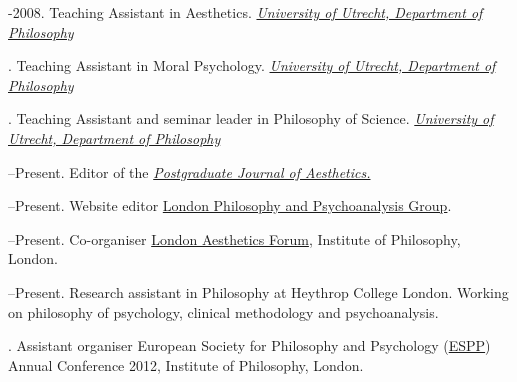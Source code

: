 \documentclass[11pt]{article}
\begin{document}
% 
% 
% 
-2008. Teaching Assistant in Aesthetics. \href{http://www.uu.nl/faculty/humanities/EN/organisation/departments/departmentofphilosophy/Pages/default.aspx}{\emph{University of Utrecht, Department of  Philosophy}} \vspace{0.01in}

. Teaching Assistant in Moral Psychology. \href{http://www.uu.nl/faculty/humanities/EN/organisation/departments/departmentofphilosophy/Pages/default.aspx}{\emph{University of Utrecht, Department of  Philosophy}} \vspace{0.01in}

. Teaching Assistant and seminar leader in Philosophy of Science. \href{http://www.uu.nl/faculty/humanities/EN/organisation/departments/departmentofphilosophy/Pages/default.aspx}{\emph{University of Utrecht, Department of  Philosophy}} \vspace{0.01in}

\bigskip


% 
% 
% 
% 


\medskip

--Present. Editor of the \href{http:\\www.pjaesthetics.org}{\emph{Postgraduate Journal of Aesthetics.}}

--Present. Website editor \href{http://www.philosophy-psychoanalysis.org.uk}{London Philosophy and Psychoanalysis Group}.

--Present. Co-organiser \href{http:\\www.londonaestheticsforum.org}{London Aesthetics Forum}, Institute of Philosophy, London.

--Present. Research assistant in Philosophy at Heythrop College London. Working on philosophy of psychology, clinical methodology and psychoanalysis.

. Assistant organiser European Society for Philosophy and Psychology (\href{http://www.eurospp.org}{ESPP}) Annual Conference 2012, Institute of Philosophy, London. 
\end{document}
